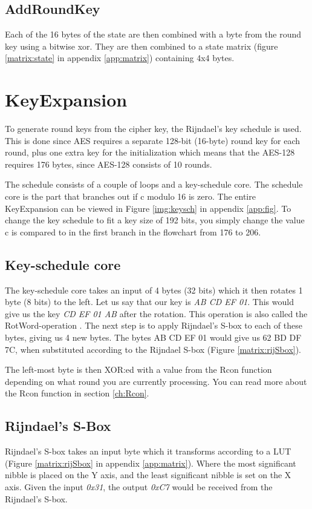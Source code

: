 \subsection{AddRoundKey}
Each of the 16 bytes of the state are then combined with a byte from 
the round key using a bitwise xor. They are then combined to a state 
matrix (figure \ref{matrix:state} in appendix \ref{app:matrix}) 
containing 4x4 bytes.

\section{KeyExpansion}\label{sec:KeySch}
To generate round keys from the cipher key, the Rijndael's key schedule
is used. This is done since AES requires a separate 128-bit (16-byte) 
round key for each round, plus one extra key for the initialization 
which means that the AES-128 requires 176 bytes, since AES-128 consists 
of 10 rounds.

The schedule consists of a couple of loops and a key-schedule core. The 
schedule core is the part that branches out if c modulo 16 is zero. 
The entire KeyExpansion can be viewed in Figure \ref{img:keysch} in 
appendix \ref{app:fig}. To change the key schedule to fit a key size of 
192 bits, you simply change the value c is compared to in the first 
branch in the flowchart from 176 to 206.

\subsection{Key-schedule core}\label{sec:kCore}
The key-schedule core takes an input of 4 bytes (32 bits) which it then 
rotates 1 byte (8 bits) to the left. Let us say that our key is 
\emph{AB CD EF 01}. This would give us the key \emph{CD EF 01 AB} after 
the rotation. This operation is also called the RotWord-operation 
\citep[p. 107]{Stinson:2006}. The next step is to apply Rijndael's 
S-box to each of these bytes, giving us 4 new bytes. The bytes 
{AB CD EF 01} would give us {62 BD DF 7C}, when substituted according 
to the Rijndael S-box (Figure \ref{matrix:rijSbox}).

The left-most byte is then XOR:ed with a value from the Rcon function 
depending on what round you are currently processing. You can read more 
about the Rcon function in section \ref{ch:Rcon}.

\subsection{Rijndael's S-Box}
Rijndael's S-box takes an input byte which it transforms according to a 
LUT (Figure \ref{matrix:rijSbox} in appendix \ref{app:matrix}). Where 
the most significant nibble is placed on the Y axis, and the least 
significant nibble is set on the X axis. Given the input \emph{0x31}, 
the output \emph{0xC7} would be received from the Rijndael's S-box.

